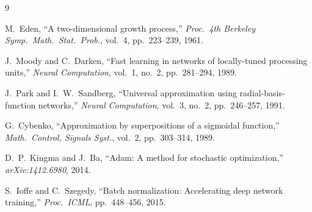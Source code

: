 \documentclass[conference]{IEEEtran}
\begin{document}
\begin{thebibliography}{9}

M.\ Eden, ``A two-dimensional growth process,''
\textit{Proc.\ 4th Berkeley Symp.\ Math.\ Stat.\ Prob.}, vol.~4,
pp.~223--239, 1961.

J.\ Moody and C.\ Darken,
``Fast learning in networks of locally-tuned processing units,''
\textit{Neural Computation}, vol.~1, no.~2, pp.~281--294, 1989.

J.\ Park and I.~W.\ Sandberg,
``Universal approximation using radial-basis-function networks,''
\textit{Neural Computation}, vol.~3, no.~2, pp.~246--257, 1991.

G.\ Cybenko,
``Approximation by superpositions of a sigmoidal function,''
\textit{Math.\ Control, Signals Syst.}, vol.~2, pp.~303--314, 1989.

D.\ P.\ Kingma and J.\ Ba,
``Adam: A method for stochastic optimization,''
\textit{arXiv:1412.6980}, 2014.

S.\ Ioffe and C.\ Szegedy,
``Batch normalization: Accelerating deep network training,''
\textit{Proc.\ ICML}, pp.~448--456, 2015.

\end{thebibliography}
\end{document}

